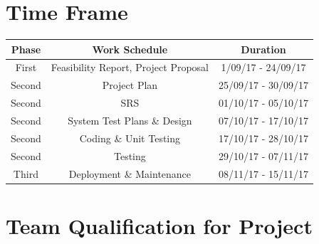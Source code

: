 \documentclass[12pt]{article}
\begin{document}
\section{Time Frame}
\begin{center}
	{%
		\begin{tabular}{ | c | c | c |  }
			\hline
			Phase & Work Schedule                         & Duration           \\
			\hline
			First     & Feasibility Report, Project Proposal & 1/09/17 - 24/09/17 \\
			\hline
			Second    & Project Plan          &      25/09/17 - 30/09/17\\ 
			\hline
			
			Second    & SRS        &   01/10/17 - 05/10/17\\ 
			\hline
			
			Second    & System Test Plans \& Design        &   07/10/17 - 17/10/17\\ 
			\hline
			
			Second    & Coding \& Unit Testing       &   17/10/17 - 28/10/17\\ 
			\hline
			
			
			Second    & Testing        &   29/10/17 - 07/11/17\\ 
			\hline
			
			
			Third    & Deployment \& Maintenance &   08/11/17 - 15/11/17\\ 
			\hline

		\end{tabular}
	}	
	\end{center}
\newpage
\section{Team Qualification for Project}
\end{document}
